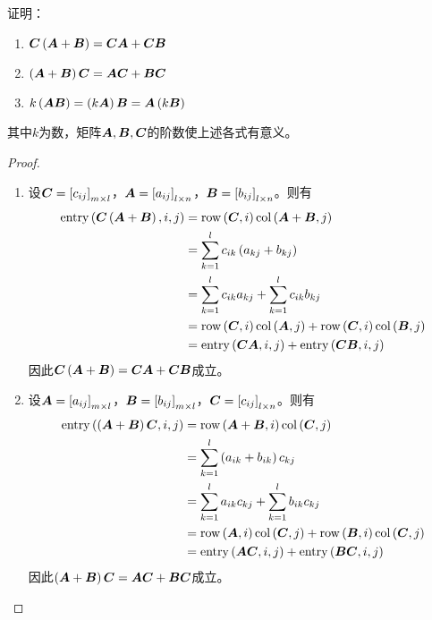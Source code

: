 \begin{extraprob}\label{extra-1.4}
    证明：
    \begin{enumerate}
        \item \(\matc\mypar{\mata+\matb}=\matc\mata+\matc\matb\)
        \item \(\mypar{\mata+\matb}\matc=\mata\matc+\matb\matc\)
        \item \(k\mypar{\mata\matb}=\mypar{k\mata}\matb=\mata\mypar{k\matb}\)
    \end{enumerate}
    其中\(k\)为数，矩阵\(\mata,\matb,\matc\)的阶数使上述各式有意义。
\end{extraprob}
\begin{proof}
    \begin{enumerate}
        \item
              {
              设\(\matc=\mat{c_{ij}}_{m\times l}\)，\(\mata=\mat{a_{ij}}_{l\times n}\)，\(\matb=\mat{b_{ij}}_{l\times n}\)。则有
              \begin{align*}
                  \entry{\matc\mypar{\mata+\matb}}{i}{j} & =\row{\matc}{i}\col{\mata+\matb}{j}                        \\
                                                         & =\sum_{k=1}^lc_{ik}\mypar{a_{kj}+b_{kj}}                   \\
                                                         & =\sum_{k=1}^lc_{ik}a_{kj}+\sum_{k=1}^lc_{ik}b_{kj}         \\
                                                         & =\row{\matc}{i}\col{\mata}{j}+\row{\matc}{i}\col{\matb}{j} \\
                                                         & =\entry{\matc\mata}{i}{j}+\entry{\matc\matb}{i}{j}
              \end{align*}
              因此\(\matc\mypar{\mata+\matb}=\matc\mata+\matc\matb\)成立。
              }

        \item
              {
              设\(\mata=\mat{a_{ij}}_{m\times l}\)，\(\matb=\mat{b_{ij}}_{m\times l}\)，\(\matc=\mat{c_{ij}}_{l\times n}\)。则有
              \begin{align*}
                  \entry{\mypar{\mata+\matb}\matc}{i}{j} & =\row{\mata+\matb}{i}\col{\matc}{j}                        \\
                                                         & =\sum_{k=1}^l\mypar{a_{ik}+b_{ik}}c_{kj}                   \\
                                                         & =\sum_{k=1}^la_{ik}c_{kj}+\sum_{k=1}^lb_{ik}c_{kj}         \\
                                                         & =\row{\mata}{i}\col{\matc}{j}+\row{\matb}{i}\col{\matc}{j} \\
                                                         & =\entry{\mata\matc}{i}{j}+\entry{\matb\matc}{i}{j}
              \end{align*}
              因此\(\mypar{\mata+\matb}\matc=\mata\matc+\matb\matc\)成立。
              }


\end{enumerate}
\end{proof}
